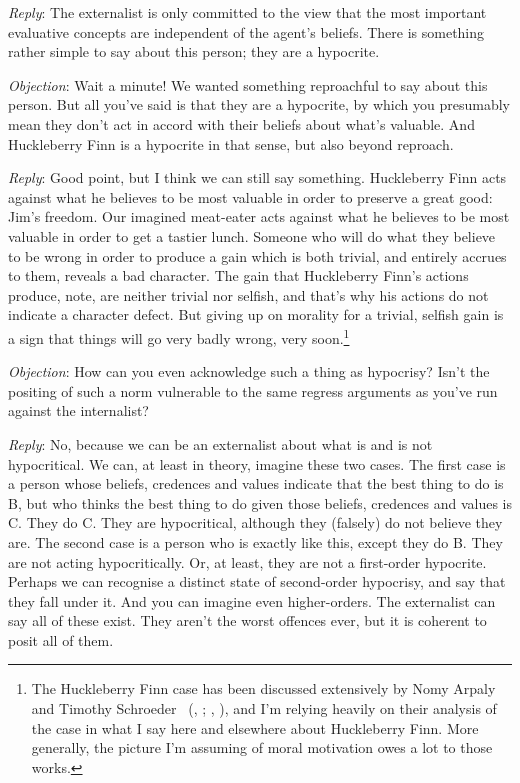 \documentclass[
  11pt,
  letterpaper,
  DIV=11,
  numbers=noendperiod,
  twoside]{scrartcl}
\begin{document}
\emph{Reply}: The externalist is only committed to the view that the
most important evaluative concepts are independent of the agent's
beliefs. There is something rather simple to say about this person; they
are a hypocrite.

\emph{Objection}: Wait a minute! We wanted something reproachful to say
about this person. But all you've said is that they are a hypocrite, by
which you presumably mean they don't act in accord with their beliefs
about what's valuable. And Huckleberry Finn is a hypocrite in that
sense, but also beyond reproach.

\emph{Reply}: Good point, but I think we can still say something.
Huckleberry Finn acts against what he believes to be most valuable in
order to preserve a great good: Jim's freedom. Our imagined meat-eater
acts against what he believes to be most valuable in order to get a
tastier lunch. Someone who will do what they believe to be wrong in
order to produce a gain which is both trivial, and entirely accrues to
them, reveals a bad character. The gain that Huckleberry Finn's actions
produce, note, are neither trivial nor selfish, and that's why his
actions do not indicate a character defect. But giving up on morality
for a trivial, selfish gain is a sign that things will go very badly
wrong, very soon.\footnote{The Huckleberry Finn case has been discussed
  extensively by Nomy Arpaly and Timothy Schroeder
  ~(,
  ;
  ,
  ), and I'm relying heavily on
  their analysis of the case in what I say here and elsewhere about
  Huckleberry Finn. More generally, the picture I'm assuming of moral
  motivation owes a lot to those works.}

\emph{Objection}: How can you even acknowledge such a thing as
hypocrisy? Isn't the positing of such a norm vulnerable to the same
regress arguments as you've run against the internalist?

\emph{Reply}: No, because we can be an externalist about what is and is
not hypocritical. We can, at least in theory, imagine these two cases.
The first case is a person whose beliefs, credences and values indicate
that the best thing to do is B, but who thinks the best thing to do
given those beliefs, credences and values is C. They do C. They are
hypocritical, although they (falsely) do not believe they are. The
second case is a person who is exactly like this, except they do B. They
are not acting hypocritically. Or, at least, they are not a first-order
hypocrite. Perhaps we can recognise a distinct state of second-order
hypocrisy, and say that they fall under it. And you can imagine even
higher-orders. The externalist can say all of these exist. They aren't
the worst offences ever, but it is coherent to posit all of them.
\end{document}
